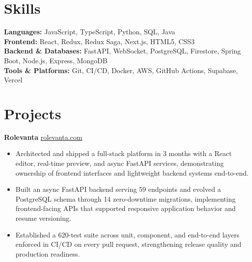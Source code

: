 \documentclass[11pt]{article}       %
\begin{document}
\vspace{-10.5pt}

\section*{Skills}
\textbf{Languages:} JavaScript, TypeScript, Python, SQL, Java \\
\textbf{Frontend:} React, Redux, Redux Saga, Next.js, HTML5, CSS3 \\
\textbf{Backend \& Databases:} FastAPI, WebSocket, PostgreSQL, Firestore, Spring Boot, Node.js, Express, MongoDB \\
\textbf{Tools \& Platforms:} Git, CI/CD, Docker, AWS, GitHub Actions, Supabase, Vercel
\vspace{-5pt}






\section*{Projects}
\textbf{Rolevanta} \hfill \href{https://rolevanta.com}{rolevanta.com} \\
\vspace{-9pt}
\begin{itemize}
  \item Architected and shipped a full-stack platform in 3 months with a React editor, real-time preview, and async FastAPI services, demonstrating ownership of frontend interfaces and lightweight backend systems end-to-end.
  \item Built an async FastAPI backend serving 59 endpoints and evolved a PostgreSQL schema through 14 zero-downtime migrations, implementing frontend-facing APIs that supported responsive application behavior and resume versioning.
  \item Established a 620-test suite across unit, component, and end-to-end layers enforced in CI/CD on every pull request, strengthening release quality and production readiness.
\end{itemize}
\end{document}
